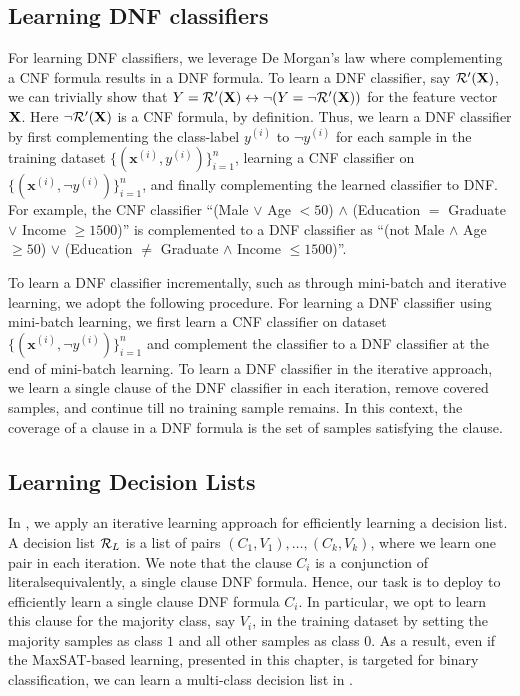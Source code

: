 \subsection{Learning DNF classifiers} 
\label{interpretability_imli_sec:dnf_learning}
For learning DNF classifiers, we leverage De Morgan's law where complementing a CNF formula results in a DNF formula. To learn a DNF classifier, say $ {\mathcal{R}}'(\mathbf{X}) $, we can trivially show that $ Y = {\mathcal{R}}'(\mathbf{X}) \leftrightarrow \neg (Y = \neg {\mathcal{R}}'(\mathbf{X})) $ for the feature vector $ \mathbf{X} $. Here $ \neg {\mathcal{R}}'(\mathbf{X}) $ is a CNF formula, by definition. Thus, we learn a DNF classifier by first complementing the class-label $ y^{(i)} $ to $ \neg y^{(i)} $ for each sample in the training dataset $ \{(\mathbf{x}^{(i)}, y^{(i)})\}_{i=1}^n $, learning a CNF classifier on $ \{(\mathbf{x}^{(i)}, \neg y^{(i)})\}_{i=1}^n $, and finally complementing the learned classifier to DNF. For example, the CNF classifier  ``(Male $ \vee $ Age $ < 50 $) $ \wedge $ (Education $ = $ Graduate $ \vee $ Income  $ \ge 1500 $)'' 	is complemented to a DNF classifier as 	 ``(not Male $ \wedge $ Age $ \ge 50 $) $ \vee $ (Education $ \ne $ Graduate $ \wedge $ Income $ \le 1500 $)''. 


To learn a DNF classifier incrementally, such as through mini-batch and iterative learning, we adopt the following procedure. For learning a DNF classifier using mini-batch learning, we first learn a CNF classifier on dataset $ \{(\mathbf{x}^{(i)}, \neg y^{(i)})\}_{i=1}^n $ and complement the classifier to a DNF classifier at the end of mini-batch learning. To learn a DNF classifier in the iterative approach, we  learn a single clause of the DNF classifier in each iteration, remove covered samples, and continue till no training sample remains. In this context, the coverage of a clause in a DNF formula is the set of samples satisfying the clause. 



\subsection{Learning Decision Lists}
In {\imli}, we apply an iterative learning approach for efficiently learning a  decision list. A decision list  $ {\mathcal{R}}_L $ is a list of pairs $ (C_1, V_1), \dots, (C_k, V_k) $, where we learn one pair in each iteration.  We note that the clause $ C_i $ is a conjunction of literals\textemdash equivalently, a single clause DNF formula. Hence, our task is to deploy {\imli} to efficiently learn a single clause DNF formula $ C_i $. In particular, we opt to learn this clause for the majority class, say $ V_i $, in the training dataset by setting the majority samples as class $ 1 $ and all other samples as class $ 0 $. As a result, even if the MaxSAT-based learning, presented in this chapter, is targeted for binary classification, we can learn a multi-class decision list in {\imli}. 


